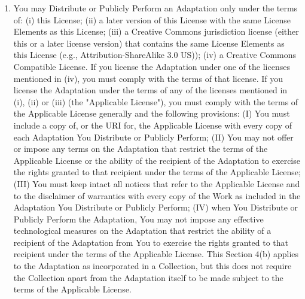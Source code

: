 \begin{enumerate}
\item You may Distribute or Publicly Perform an Adaptation
  only under the terms of: (i) this License; (ii) a later
  version of this License with the same License Elements as
  this License; (iii) a Creative Commons jurisdiction
  license (either this or a later license version) that
  contains the same License Elements as this License (e.g.,
  Attribution-ShareAlike 3.0 US)); (iv) a Creative Commons
  Compatible License. If you license the Adaptation under
  one of the licenses mentioned in (iv), you must comply
  with the terms of that license. If you license the
  Adaptation under the terms of any of the licenses
  mentioned in (i), (ii) or (iii) (the "Applicable
  License"), you must comply with the terms of the
  Applicable License generally and the following
  provisions: (I) You must include a copy of, or the URI
  for, the Applicable License with every copy of each
  Adaptation You Distribute or Publicly Perform; (II) You
  may not offer or impose any terms on the Adaptation that
  restrict the terms of the Applicable License or the
  ability of the recipient of the Adaptation to exercise
  the rights granted to that recipient under the terms of
  the Applicable License; (III) You must keep intact all
  notices that refer to the Applicable License and to the
  disclaimer of warranties with every copy of the Work as
  included in the Adaptation You Distribute or Publicly
  Perform; (IV) when You Distribute or Publicly Perform the
  Adaptation, You may not impose any effective
  technological measures on the Adaptation that restrict
  the ability of a recipient of the Adaptation from You to
  exercise the rights granted to that recipient under the
  terms of the Applicable License. This Section 4(b)
  applies to the Adaptation as incorporated in a
  Collection, but this does not require the Collection
  apart from the Adaptation itself to be made subject to
  the terms of the Applicable License.


\end{enumerate}
